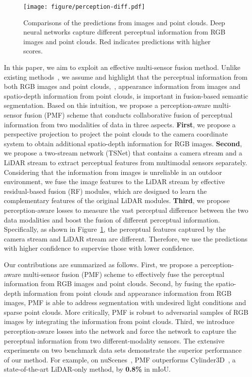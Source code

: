\documentclass[10pt,twocolumn,letterpaper]{article}
\newcommand{\ice}[1]{{\color{black}#1}}
\begin{document}
\begin{figure}[t]
    \centering
    \texttt{[image: figure/perception-diff.pdf]}
    \caption{Comparisons of the predictions from images and point clouds. Deep neural networks capture different perceptual information from RGB images and point clouds. Red indicates predictions with higher scores.}
    \label{fig:perceptual_confidence}
    \vskip -0.15in
\end{figure}



In this paper, we aim to exploit an effective multi-sensor fusion method. Unlike  existing methods~\cite{Madawy2019RGBAL,vora2020pointpainting}, \ice{we assume and highlight that the perceptual information from both RGB images and point clouds,~\ie, appearance information from images and spatio-depth information from point clouds, is important in fusion-based semantic segmentation. Based on this intuition, we propose a perception-aware multi-sensor fusion (PMF) scheme that conducts collaborative fusion of perceptual information from two modalities of data in three aspects. \textbf{First}, we propose a perspective projection to project the point clouds to the camera coordinate system to obtain additional spatio-depth information for RGB images. \textbf{Second}, we propose a two-stream network (TSNet) that contains a camera stream and a LiDAR stream to extract perceptual features from multimodal sensors separately. Considering that the information from images is unreliable in an outdoor environment, we fuse the image features to the LiDAR stream by effective residual-based fusion (RF) modules, which are designed to learn the complementary features of the original LiDAR modules. \textbf{Third}, we propose perception-aware losses to measure the vast perceptual difference between the two data modalities and boost the fusion of different perceptual information. Specifically, as shown in Figure~\ref{fig:perceptual_confidence}, the perceptual features captured by the camera stream and LiDAR stream are different. Therefore, we use the predictions with higher confidence to supervise those with lower confidence.}




Our contributions are summarized as follows. First, we propose a perception-aware multi-sensor fusion (PMF) scheme to effectively fuse the perceptual information from RGB images and point clouds. Second, by fusing the spatio-depth information from point clouds and appearance information from RGB images, PMF is able to address segmentation with undesired light conditions and sparse point clouds. More critically, PMF is robust to adversarial samples of RGB images by integrating the information from point clouds.
Third, we introduce perception-aware losses into the network and \ice{force the network to capture the perceptual information from two different-modality sensors}. The extensive experiments on two benchmark data sets demonstrate the superior performance of our method. For example, 
on nuScenes~\cite{caesar2020nuscenes},  PMF outperforms Cylinder3D~\cite{zhu2021cylindrical}, a state-of-the-art LiDAR-only method, by \textbf{0.8\%} in mIoU.
\end{document}
